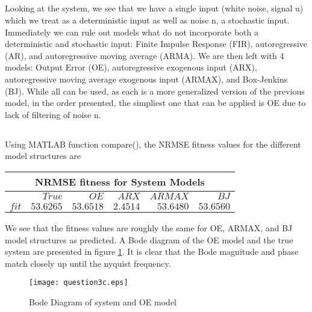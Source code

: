 \documentclass[times,12pt,reqno]{amsart}
\begin{document}
\subsection{}
Looking at the system, we see that we have a single input (white noise,
signal u) which we treat as a deterministic input as well as noise n, a
stochastic input. Immediately we can rule out models what do not incorporate
both a deterministic and stochastic input: Finite Impulse Response (FIR),
autoregressive (AR), and autoregressive moving average (ARMA). We are then left
with 4 models: Output Error (OE), autoregressive exogenous input (ARX),
autoregressive moving average exogenous input (ARMAX), and Box-Jenkins (BJ).
While all can be used, as each is a more generalized version of the previous
model, in the order presented, the simpliest one that can be applied is OE due
to lack of filtering of noise n.

\subsection{}

Using MATLAB function compare(), the NRMSE fitness values for the different
model structures are
\begin{center}
    \begin{tabular} {|r|r|r|r|r|r|}
        \hline
        \multicolumn{6}{|c|}{NRMSE fitness for System Models} \\
        \hline
        \nonumber & ${True}$ & ${OE}$ & ${ARX}$ & ${ARMAX}$ & ${BJ}$ \\
        \hline
        $fit$ & $53.6265$ & $53.6518$ & $2.4514$ & $53.6480$ & $53.6560$ \\
        \hline
    \end{tabular}
\end{center}

We see that the fitness values are roughly the same for OE, ARMAX, and BJ model
structures as predicted. A Bode diagram of the OE model and the true system are
presented in figure \ref{fig:q3c}. It is clear that the Bode magnitude and
phase match closely up until the nyquist frequency.
\begin{figure}[H]
    \begin{center}
        \texttt{[image: question3c.eps]}
    \end{center}
    \caption{Bode Diagram of system and OE model}
    \label{fig:q3c}
\end{figure}
\end{document}

